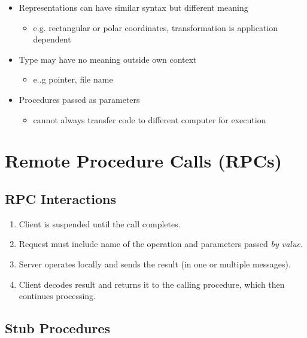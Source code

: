 \documentclass[twocolumn,landscape,10pt]{article}
\theoremstyle{definition}
\begin{document}
\begin{itemize}
    \item Representations can have similar syntax but different meaning
        \begin{itemize}
            \item e.g. rectangular or polar coordinates, transformation is
                application dependent
        \end{itemize} 
    \item Type may have no meaning outside own context
        \begin{itemize}
            \item e..g pointer, file name
        \end{itemize} 
    \item Procedures passed as parameters
        \begin{itemize}
            \item cannot always transfer code to different computer for
                execution
        \end{itemize} 
\end{itemize} 


\section{Remote Procedure Calls (RPCs)}

\subsection{RPC Interactions}

\begin{enumerate}
    \item Client is suspended until the call completes.
    \item Request must include name of the operation and parameters passed
        \emph{by value}.
    \item Server operates locally and sends the result (in one or
        multiple messages).
    \item Client decodes result and returns it to the calling procedure, which
        then continues processing.
\end{enumerate} 

\subsection{Stub Procedures}
\end{document}
